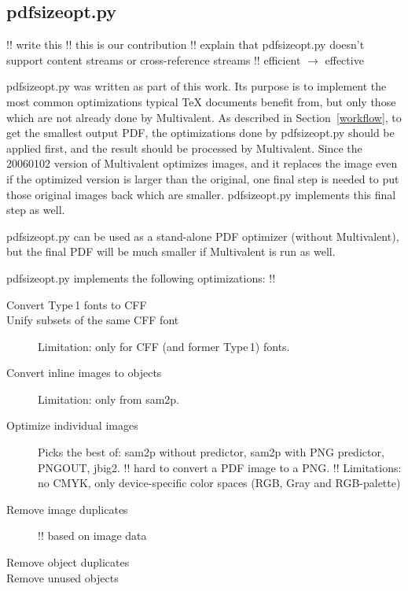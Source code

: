 \documentclass{ltugproc}
\def\cmd{\textsf}
\begin{document}
\subsection{pdfsizeopt.py}

!! write this
!! this is our contribution
!! explain that pdfsizeopt.py doesn't support content streams or cross-reference streams
!! efficient $\to$ effective

\cmd{pdfsizeopt.py} \cite{pdfsizeopt} was written as part of this work. Its purpose is to
implement the most common optimizations typical \TeX{} documents benefit
from, but only those which are not already done by Multivalent. As described
in Section~\ref{workflow}, to get the smallest output PDF, the optimizations
done by \cmd{pdfsizeopt.py} should be applied first, and the result should
be processed by Multivalent. Since the 20060102 version of Multivalent
optimizes images, and it replaces the image even if the optimized version is
larger than the original, one final step is needed to put those
original images back which are smaller. \cmd{pdfsizeopt.py}
implements this final step as well.

\cmd{pdfsizeopt.py} can be used as a stand-alone PDF optimizer (without
Multivalent), but the final PDF will be much smaller if Multivalent
is run as well.

\cmd{pdfsizeopt.py} implements the following optimizations: !!

\begin{description}

\item[Convert Type\,1 fonts to CFF]

\item[Unify subsets of the same CFF font]
Limitation: only for CFF (and former Type\,1) fonts.

\item[Convert inline images to objects]
Limitation: only from sam2p.

\item[Optimize individual images]
Picks the best of: \cmd{sam2p} without predictor, \cmd{sam2p} with
PNG predictor, PNGOUT, \cmd{jbig2}.
!! hard to convert a PDF image to a PNG.
!! Limitations: no CMYK, only device-specific color spaces (RGB, Gray and
   RGB-palette)

\item[Remove image duplicates]
!! based on image data

\item[Remove object duplicates]

\item[Remove unused objects]


\end{description}
\end{document}
